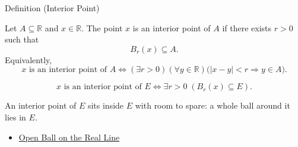 \begin{definitionbox}{Definition (Interior Point)}
\begin{definition}
\label{def:interior-point}
Let $A\subseteq\mathbb{R}$ and $x\in\mathbb{R}$.  The point $x$ is an
interior point of $A$ if there exists $r>0$ such that
\[
  B_r(x)\subseteq A.
\]
Equivalently,
\[
  x\text{ is an interior point of }A
  \Longleftrightarrow
  (\exists r>0)(\forall y\in\mathbb{R})
  \bigl(|x-y|<r\Longrightarrow y\in A\bigr).
\]
\end{definition}
\end{definitionbox}
\begin{remark*}
\[
x \text{ is an interior point of } E \Longleftrightarrow \exists r>0\;(B_{r}(x)\subseteq E).
\]
\end{remark*}
\begin{remark*}[Interpretation]
An interior point of $E$ sits inside $E$ with room to spare: a whole ball around it lies in $E$.
\end{remark*}
\begin{dependencies}
\begin{itemize}
  \item \hyperref[def:open-ball]{Open Ball on the Real Line}
\end{itemize}
\end{dependencies}
